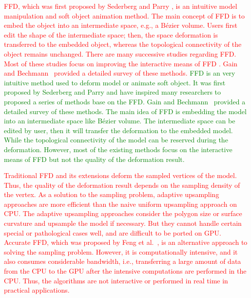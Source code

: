 \documentclass[3p]{elsarticle}
\begin{document}
\textcolor{red}{FFD, which was first proposed by Sederberg and Parry \cite{Sederberg86}, is an intuitive model manipulation and soft
object animation method. The main concept of FFD is to embed the object into an intermediate space, e.g., a B\'ezier
volume. Users first edit the shape of the intermediate space; then, the space deformation is transferred to the embedded
object, whereas the topological connectivity of the object remains unchanged. There are many successive studies
regarding FFD. Most of these studies focus on improving the interactive means of FFD \cite{Coquillart90, Hui02,
MacCracken96, McDonnel07, Xu13}. Gain and Bechmann~\cite{Gain08} provided a detailed survey of these methods.}
\textcolor{green}{
    FFD is an very intuitive method used to deform model or animate soft object. It was first proposed by Sederberg and Parry \cite{Sederberg86} and have inspired many researchers to proposed a series of methods base on the FFD. Gain and Bechmann~\cite{Gain08} provided a detailed survey of these methods. The main idea of FFD is embedding the model into an intermediate space like B\'ezier volume. The intermediate space can be edited by user, then it will transfer the deformation to the embedded model. While the topological connectivity of the model can be reserved during the deformation. However, most of the existing methods focus on the interactive means of FFD but not the quality of the deformation result.
}

\textcolor{red}{Traditional FFD and its extensions deform the sampled vertices of the model. Thus, the quality of the deformation result
depends on the sampling density of the vertex. As a solution to the sampling problem, adaptive upsampling approaches
\cite{Gain99, Griessmair89, Parry86} are more efficient than the naive uniform upsampling approach on CPU. The adaptive
upsampling approaches consider the polygon size or surface curvature and upsample the model if necessary. But they
cannot handle certain special or pathological cases well, and are difficult to be ported on GPU. Accurate FFD, which
was proposed by Feng et al.~\cite{Feng98, Feng02, Feng00}, is an alternative approach to solving the sampling problem.
However, it is computationally intensive, and it also consumes considerable bandwidth, i.e., transferring a large amount
of data from the CPU to the GPU after the intensive computations are performed in the CPU. Thus, the algorithms are not
interactive or performed in real time in practical applications.}

\textcolor{green}{
}
\end{document}
